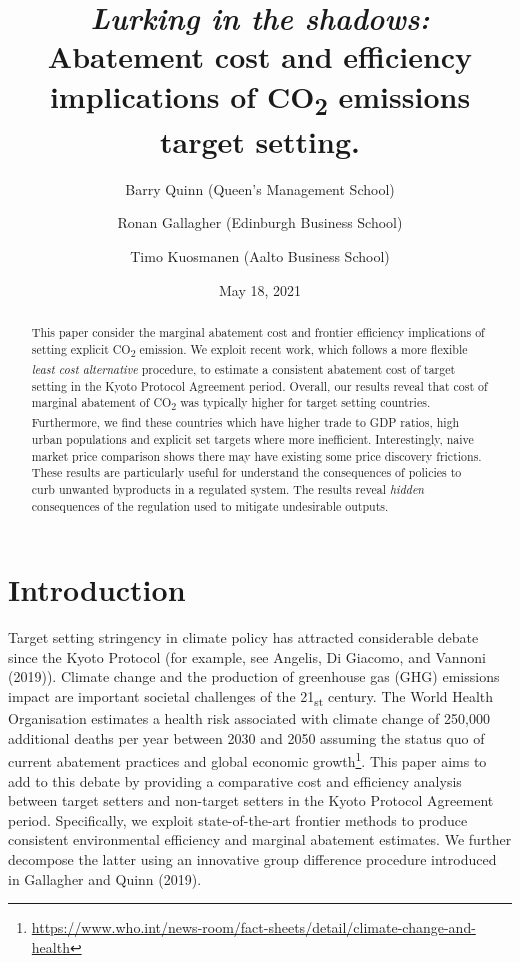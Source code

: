 \documentclass[
  10pt,
]{article}
\title{\emph{Lurking in the shadows:} Abatement cost and efficiency
implications of CO\textsubscript{2} emissions target setting.}
\author{Barry Quinn (Queen's Management School) \and Ronan Gallagher (Edinburgh Business School) \and Timo Kuosmanen (Aalto Business School)}
\date{May 18, 2021}
\begin{document}
\maketitle
\begin{abstract}
This paper consider the marginal abatement cost and frontier efficiency
implications of setting explicit CO\textsubscript{2} emission. We
exploit recent work, which follows a more flexible \emph{least cost
alternative} procedure, to estimate a consistent abatement cost of
target setting in the Kyoto Protocol Agreement period. Overall, our
results reveal that cost of marginal abatement of CO\textsubscript{2}
was typically higher for target setting countries. Furthermore, we find
these countries which have higher trade to GDP ratios, high urban
populations and explicit set targets where more inefficient.
Interestingly, naive market price comparison shows there may have
existing some price discovery frictions. These results are particularly
useful for understand the consequences of policies to curb unwanted
byproducts in a regulated system. The results reveal \emph{hidden}
consequences of the regulation used to mitigate undesirable outputs.
\end{abstract}

\hypertarget{introduction}{%
\section{Introduction}\label{introduction}}

Target setting stringency in climate policy has attracted considerable
debate since the Kyoto Protocol (for example, see Angelis, Di Giacomo,
and Vannoni (2019)). Climate change and the production of greenhouse gas
(GHG) emissions impact are important societal challenges of the
21\textsubscript{st} century. The World Health Organisation estimates a
health risk associated with climate change of 250,000 additional deaths
per year between 2030 and 2050 assuming the status quo of current
abatement practices and global economic growth\footnote{\url{https://www.who.int/news-room/fact-sheets/detail/climate-change-and-health}}.
This paper aims to add to this debate by providing a comparative cost
and efficiency analysis between target setters and non-target setters in
the Kyoto Protocol Agreement period. Specifically, we exploit
state-of-the-art frontier methods to produce consistent environmental
efficiency and marginal abatement estimates. We further decompose the
latter using an innovative group difference procedure introduced in
Gallagher and Quinn (2019).
\end{document}
